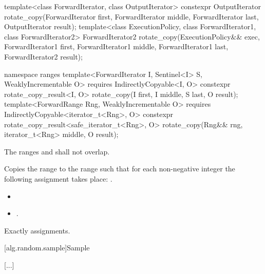 %
\begin{itemdecl}
template<class ForwardIterator, class OutputIterator>
  constexpr OutputIterator
    rotate_copy(ForwardIterator first, ForwardIterator middle, ForwardIterator last,
                OutputIterator result);
template<class ExecutionPolicy, class ForwardIterator1, class ForwardIterator2>
  ForwardIterator2
    rotate_copy(ExecutionPolicy&& exec,
                ForwardIterator1 first, ForwardIterator1 middle, ForwardIterator1 last,
                ForwardIterator2 result);
\end{itemdecl}
\begin{addedblock}
\begin{itemdecl}
namespace ranges {
  template<ForwardIterator I, Sentinel<I> S, WeaklyIncrementable O>
    requires IndirectlyCopyable<I, O>
    constexpr rotate_copy_result<I, O>
      rotate_copy(I first, I middle, S last, O result);
  template<ForwardRange Rng, WeaklyIncrementable O>
    requires IndirectlyCopyable<iterator_t<Rng>, O>
    constexpr rotate_copy_result<safe_iterator_t<Rng>, O>
      rotate_copy(Rng&& rng, iterator_t<Rng> middle, O result);
}
\end{itemdecl}
\end{addedblock}

\begin{itemdescr}
\pnum
\requires
The ranges
and
shall not overlap.

\pnum
\effects
Copies the range
to the range
such that for each non-negative integer
the following assignment takes place:
.

\pnum
\returns
\begin{itemize}
\item {} 
\item {}.
\end{itemize}

\pnum
\complexity
Exactly
assignments.
\end{itemdescr}


[alg.random.sample]{Sample}

[...]

